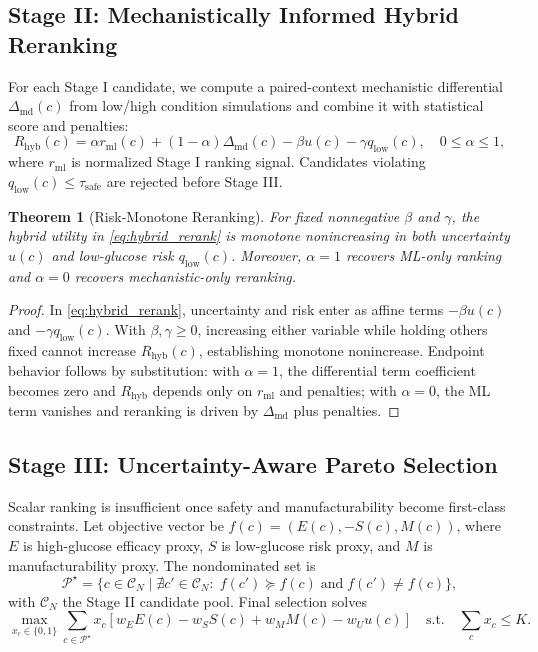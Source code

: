 \documentclass{article} %
\newtheorem{theorem}{Theorem}[section]
\begin{document}
\subsection{Stage II: Mechanistically Informed Hybrid Reranking}
For each Stage I candidate, we compute a paired-context mechanistic differential $\Delta_{\mathrm{md}}(c)$ from low/high condition simulations and combine it with statistical score and penalties:
\begin{equation}
R_{\mathrm{hyb}}(c)=\alpha r_{\mathrm{ml}}(c)+(1-\alpha)\Delta_{\mathrm{md}}(c)-\beta u(c)-\gamma q_{\mathrm{low}}(c),\quad 0\le \alpha\le 1,
\label{eq:hybrid_rerank}
\end{equation}
where $r_{\mathrm{ml}}$ is normalized Stage I ranking signal. Candidates violating $q_{\mathrm{low}}(c)\le \tau_{\mathrm{safe}}$ are rejected before Stage III.

\begin{theorem}[Risk-Monotone Reranking]
\label{thm:risk_mono}
For fixed nonnegative $\beta$ and $\gamma$, the hybrid utility in \eqref{eq:hybrid_rerank} is monotone nonincreasing in both uncertainty $u(c)$ and low-glucose risk $q_{\mathrm{low}}(c)$. Moreover, $\alpha=1$ recovers ML-only ranking and $\alpha=0$ recovers mechanistic-only reranking.
\end{theorem}
\begin{proof}
In \eqref{eq:hybrid_rerank}, uncertainty and risk enter as affine terms $-\beta u(c)$ and $-\gamma q_{\mathrm{low}}(c)$. With $\beta,\gamma\ge 0$, increasing either variable while holding others fixed cannot increase $R_{\mathrm{hyb}}(c)$, establishing monotone nonincrease. Endpoint behavior follows by substitution: with $\alpha=1$, the differential term coefficient becomes zero and $R_{\mathrm{hyb}}$ depends only on $r_{\mathrm{ml}}$ and penalties; with $\alpha=0$, the ML term vanishes and reranking is driven by $\Delta_{\mathrm{md}}$ plus penalties.\qedhere
\end{proof}

\subsection{Stage III: Uncertainty-Aware Pareto Selection}
Scalar ranking is insufficient once safety and manufacturability become first-class constraints. Let objective vector be
$f(c)=(E(c),-S(c),M(c))$, where $E$ is high-glucose efficacy proxy, $S$ is low-glucose risk proxy, and $M$ is manufacturability proxy. The nondominated set is
\begin{equation}
\mathcal{P}^{\star}=\{c\in \mathcal{C}_N\;|\;\nexists c'\in\mathcal{C}_N:\; f(c')\succeq f(c)\;\text{and}\;f(c')\neq f(c)\},
\label{eq:pareto_set}
\end{equation}
with $\mathcal{C}_N$ the Stage II candidate pool. Final selection solves
\begin{equation}
\max_{x_c\in\{0,1\}}\sum_{c\in\mathcal{P}^{\star}}x_c\left[w_EE(c)-w_SS(c)+w_MM(c)-w_Uu(c)\right]\quad\text{s.t.}\quad\sum_c x_c\le K.
\label{eq:pareto_select}
\end{equation}
\end{document}
